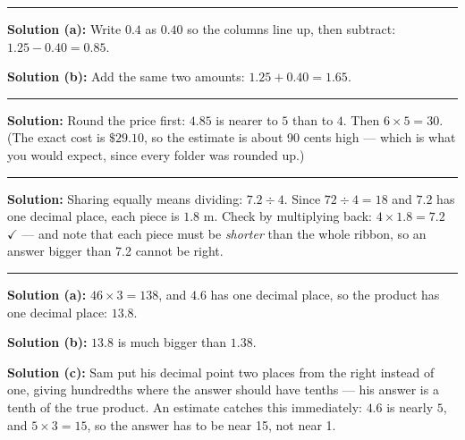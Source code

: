 \documentclass[12pt]{article}
\begin{document}
\vspace{0.2cm}\noindent\rule{\linewidth}{0.2pt}


\textbf{Solution (a):} Write $0.4$ as $0.40$ so the columns line up, then subtract:
$1.25 - 0.40 = 0.85$.

\textbf{Solution (b):} Add the same two amounts: $1.25 + 0.40 = 1.65$.

\vspace{0.2cm}\noindent\rule{\linewidth}{0.2pt}


\textbf{Solution:} Round the price first: $4.85$ is nearer to $5$ than to $4$.
Then $6 \times 5 = 30$.
(The exact cost is $\$29.10$, so the estimate is about 90 cents high --- which is what
you would expect, since every folder was rounded up.)

\vspace{0.2cm}\noindent\rule{\linewidth}{0.2pt}


\textbf{Solution:} Sharing equally means dividing: $7.2 \div 4$. Since
$72 \div 4 = 18$ and $7.2$ has one decimal place, each piece is $1.8$ m.
Check by multiplying back: $4 \times 1.8 = 7.2$ $\checkmark$ --- and note that each
piece must be \emph{shorter} than the whole ribbon, so an answer bigger than 7.2
cannot be right.

\vspace{0.2cm}\noindent\rule{\linewidth}{0.2pt}


\textbf{Solution (a):} $46 \times 3 = 138$, and $4.6$ has one decimal place, so the
product has one decimal place: $13.8$.

\textbf{Solution (b):} $13.8$ is much bigger than $1.38$.

\textbf{Solution (c):} Sam put his decimal point two places from the right instead of
one, giving hundredths where the answer should have tenths --- his answer is a tenth
of the true product. An estimate catches this immediately: $4.6$ is nearly $5$, and
$5 \times 3 = 15$, so the answer has to be near 15, not near 1.
\end{document}
